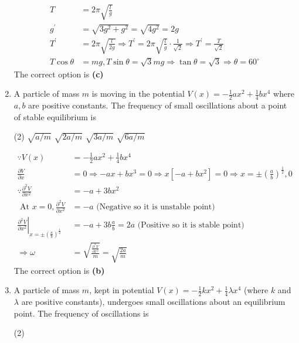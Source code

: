 \begin{enumerate}
\begin{answer}
\begin{align*}
		T&=2 \pi \sqrt{\frac{l}{g}}\\
		g^{\prime}&=\sqrt{3 g^{2}+g^{2}}=\sqrt{4 g^{2}}=2 g\\
		T^{\prime}&=2 \pi \sqrt{\frac{l}{2 g}} \Rightarrow T^{\prime}=2 \pi \sqrt{\frac{l}{g}} \cdot \frac{1}{\sqrt{2}} \Rightarrow T^{\prime}=\frac{T}{\sqrt{2}}\\
		T \cos \theta&=m g, T \sin \theta=\sqrt{3} m g \Rightarrow \tan \theta=\sqrt{3} \Rightarrow \theta=60^{\circ}
		\end{align*}
		The correct option is \textbf{(c)}	
	\end{answer}
		\item A particle of mass $m$ is moving in the potential $V(x)=-\frac{1}{2} a x^{2}+\frac{1}{4} b x^{4}$ where $a, b$ are positive constants. The frequency of small oscillations about a point of stable equilibrium is
		{}
	\begin{tasks}(2)
		\task[\textbf{A.}] $\sqrt{a / m}$
		\task[\textbf{B.}]$\sqrt{2 a / m}$
		\task[\textbf{C.}]$\sqrt{3 a / m}$
		\task[\textbf{D.}]$\sqrt{6 a / m}$
	\end{tasks}
	\begin{answer}
		\begin{align*}
		\because V(x)&=-\frac{1}{2} a x^{2}+\frac{1}{4} b x^{4}	\\
		\frac{\partial V}{\partial x}&=0 \Rightarrow-a x+b x^{3}=0 \Rightarrow x\left[-a+b x^{2}\right]=0 \Rightarrow x=\pm\left(\frac{a}{b}\right)^{\frac{1}{2}}, 0\\
		\because \frac{\partial^{2} V}{\partial x^{2}}&=-a+3 b x^{2}\\
		\text { At } x=0, \frac{\partial^{2} V}{\partial x^{2}}&=-a \text { (Negative so it is unstable point) }\\
		\left.\frac{\partial^{2} V}{\partial x^{2}}\right|_{x=\pm\left(\frac{a}{b}\right)^{\frac{1}{2}}}&=-a+3 b \frac{a}{b}=2 a \text { (Positive so it is stable point) }\\
		\Rightarrow \omega&=\sqrt{\frac{\frac{\partial^{2} V}{\partial x^{2}}}{m}}=\sqrt{\frac{2 a}{m}}
		\end{align*}
		The correct option is \textbf{(b)}
	\end{answer}
		\item A particle of mass $m$, kept in potential $V(x)=-\frac{1}{2} k x^{2}+\frac{1}{4} \lambda x^{4}$ (where $k$ and $\lambda$ are positive constants), undergoes small oscillations about an equilibrium point. The frequency of oscillations is
		{}
	\begin{tasks}(2)

\end{tasks}
\end{enumerate}
